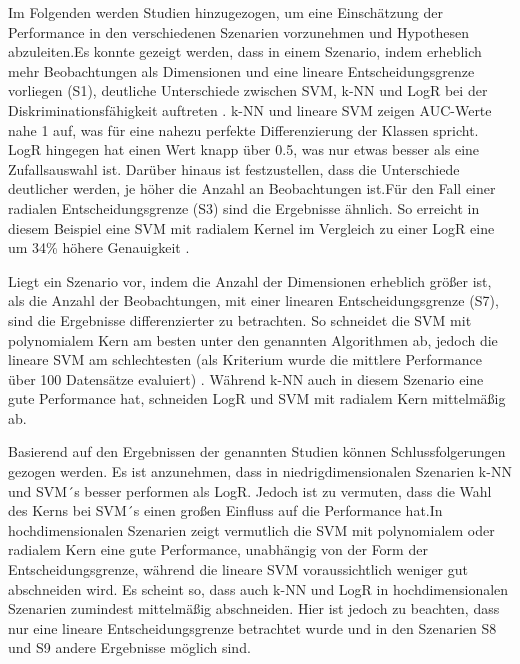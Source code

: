 \documentclass[
]{article}
\begin{document}
Im Folgenden werden Studien hinzugezogen, um eine Einschätzung der
Performance in den verschiedenen Szenarien vorzunehmen und Hypothesen
abzuleiten.\newline Es konnte gezeigt werden, dass in einem Szenario,
indem erheblich mehr Beobachtungen als Dimensionen und eine lineare
Entscheidungsgrenze vorliegen (S1), deutliche Unterschiede zwischen SVM,
k-NN und LogR bei der Diskriminationsfähigkeit auftreten
\parencite{entezari-malekiComparisonClassificationMethods2009}. k-NN und
lineare SVM zeigen AUC-Werte nahe 1 auf, was für eine nahezu perfekte
Differenzierung der Klassen spricht. LogR hingegen hat einen Wert knapp
über 0.5, was nur etwas besser als eine Zufallsauswahl ist. Darüber
hinaus ist festzustellen, dass die Unterschiede deutlicher werden, je
höher die Anzahl an Beobachtungen ist.\newline Für den Fall einer
radialen Entscheidungsgrenze (S3) sind die Ergebnisse ähnlich. So
erreicht in diesem Beispiel eine SVM mit radialem Kernel im Vergleich zu
einer LogR eine um 34\% höhere Genauigkeit
\parencite{faveroClassificationPerformanceEvaluation2022}.

Liegt ein Szenario vor, indem die Anzahl der Dimensionen erheblich
größer ist, als die Anzahl der Beobachtungen, mit einer linearen
Entscheidungsgrenze (S7), sind die Ergebnisse differenzierter zu
betrachten. So schneidet die SVM mit polynomialem Kern am besten unter
den genannten Algorithmen ab, jedoch die lineare SVM am schlechtesten
(als Kriterium wurde die mittlere Performance über 100 Datensätze
evaluiert) \parencite{scholzComparisonClassificationMethods2021}.
Während k-NN auch in diesem Szenario eine gute Performance hat,
schneiden LogR und SVM mit radialem Kern mittelmäßig ab.

Basierend auf den Ergebnissen der genannten Studien können
Schlussfolgerungen gezogen werden. Es ist anzunehmen, dass in
niedrigdimensionalen Szenarien k-NN und SVM´s besser performen als LogR.
Jedoch ist zu vermuten, dass die Wahl des Kerns bei SVM´s einen großen
Einfluss auf die Performance hat.\newline In hochdimensionalen Szenarien
zeigt vermutlich die SVM mit polynomialem oder radialem Kern eine gute
Performance, unabhängig von der Form der Entscheidungsgrenze, während
die lineare SVM voraussichtlich weniger gut abschneiden wird. Es scheint
so, dass auch k-NN und LogR in hochdimensionalen Szenarien zumindest
mittelmäßig abschneiden. Hier ist jedoch zu beachten, dass nur eine
lineare Entscheidungsgrenze betrachtet wurde und in den Szenarien S8 und
S9 andere Ergebnisse möglich sind.\newline

\printbibliography
\end{document}
